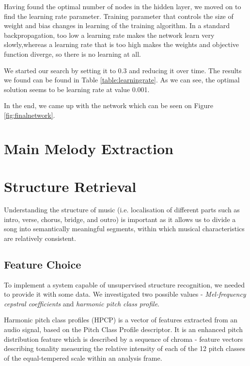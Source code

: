 Having found the optimal number of nodes in the hidden layer, we moved on to find the learning rate parameter. Training parameter that controls the size of weight and bias changes in learning of the training algorithm. In a standard backpropagation, too low a learning rate makes the network learn very slowly,whereas a learning rate that is too high makes the weights and objective function diverge, so there is no learning at all. 

We started our search by setting it to 0.3 and reducing it over time. The results we found can be found in Table \ref{table:learningrate}. As we can see, the optimal solution seems to be learning rate at value 0.001.


In the end, we came up with the network which can be seen on Figure \ref{fig:finalnetwork}.

\vspace{20pt}

\section{Main Melody Extraction}

\vspace{10pt}

\section{Structure Retrieval}

Understanding the structure of music (i.e. localisation of different parts such as intro, verse, chorus, bridge, and outro) is important as it allows us to divide a song into semantically meaningful segments, within which musical characteristics are relatively consistent.

\vspace{10pt}

\subsection{Feature Choice}

To implement a system capable of unsupervised structure recognition, we needed to provide it with some data. We investigated two possible values - \textit{Mel-frequency cepstral coefficients} and \textit{harmonic pitch class profile}.


Harmonic pitch class profiles (HPCP) is a vector of features extracted from an audio signal, based on the Pitch Class Profile descriptor. It is an enhanced pitch distribution feature which is described by a sequence of chroma - feature vectors describing tonality measuring the relative intensity of each of the 12 pitch classes of the equal-tempered scale within an analysis frame. 

